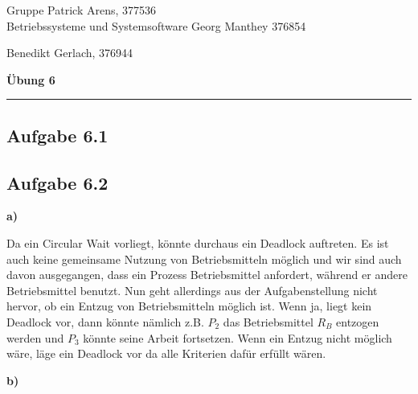 \documentclass[a4paper,graphics,11pt]{article}
\newcommand{\aufgabe}[1]{\subsection*{Aufgabe #1}}
\begin{document}
\noindent Gruppe              \hfill Patrick Arens, 377536\\
\noindent Betriebssysteme und Systemsoftware    \hfill Georg Manthey 376854\\
\strut\hfill Benedikt Gerlach, 376944\\
\begin{center}
	\LARGE{\textbf{Übung 6}}
\end{center}
\begin{center}
\rule[0.1ex]{\textwidth}{1pt}
\end{center}

\aufgabe{6.1}

\aufgabe{6.2}

\textbf{a)}


Da ein Circular Wait vorliegt, könnte durchaus ein Deadlock auftreten. Es ist auch keine gemeinsame Nutzung von Betriebsmitteln möglich und wir sind auch davon ausgegangen, dass ein Prozess Betriebsmittel anfordert, während er andere Betriebsmittel benutzt. Nun geht allerdings aus der Aufgabenstellung nicht hervor, ob ein Entzug von Betriebsmitteln möglich ist. Wenn ja, liegt kein Deadlock vor, dann könnte nämlich z.B. $P_2$ das Betriebsmittel $R_B$ entzogen werden und $P_3$ könnte seine Arbeit fortsetzen. Wenn ein Entzug nicht möglich wäre, läge ein Deadlock vor da alle Kriterien dafür erfüllt wären.

\textbf{b)}
\end{document}
